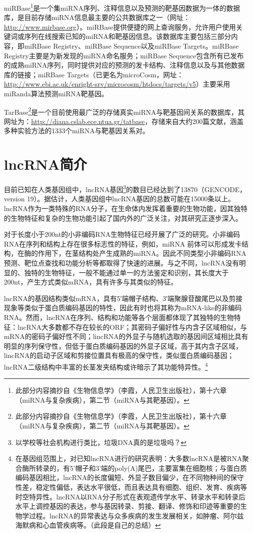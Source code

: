 \documentclass[11pt,a4paper,twoside]{book}
\begin{document}
miRBase\footnote{此部分内容摘抄自《生物信息学》（李霞，人民卫生出版社），第十六章（miRNA与复杂疾病），第二节（miRNA与其靶基因）。}是一个集miRNA序列、注释信息以及预测的靶基因数据为一体的数据库，是目前存储miRNA信息最主要的公共数据库之一（网址：\href{http://www.mirbase.org}{http://www.mirbase.org}）。miRBase提供便捷的网上查询服务，允许用户使用关键词或序列在线搜索已知的miRNA和靶基因信息。该数据库主要包括三部分内容，即miRBase Registry、miRBase Sequence以及miRBase Targets。miRBase Registry主要是为新发现的miRNA命名服务；miRBase Sequence包含所有已发布的成熟miRNA序列，同时提供对应的预测的发卡结构、注释信息以及与其他数据库的链接；miRBase Targets（已更名为microCosm，网址：\href{http://www.ebi.ac.uk/enright-srv/microcosm/htdocs/targets/v5}{http://www.ebi.ac.uk/enright-srv/microcosm/htdocs/targets/v5}）主要采用miRanda算法预测miRNA靶基因。

TarBase\footnote{此部分内容摘抄自《生物信息学》（李霞，人民卫生出版社），第十六章（miRNA与复杂疾病），第二节（miRNA与其靶基因）。}是一个目前使用最广泛的存储真实miRNA与靶基因间关系的数据库，其网址为：\href{http://diana.cslab.ece.ntua.gr/tatbase}{http://diana.cslab.ece.ntua.gr/tatbase}，存储来自大约200篇文献，涵盖多种实验方法的1333个miRNA与靶基因关系对。

\section{lncRNA简介}
目前已知在人类基因组中，lncRNA基因\footnote{以学校等社会机构进行类比，垃圾DNA真的是垃圾吗？}的数目已经达到了13870（GENCODE，version 19）。据估计，人类基因组中lncRNA基因的总数可能在15000条以上。lncRNA作为一类特殊的RNA分子，在生命体内发挥着重要的生物功能，因其独特的生物特征和复杂的生物功能引起了国内外的广泛关注，对其研究正逐步深入。

对于长度小于200nt的小非编码RNA生物特征已经开展了广泛的研究。小非编码RNA在序列和结构上存在很多标志性的特征，例如，miRNA
前体可以形成发卡结构，在酶的作用下，在茎结构处产生成熟的miRNA。因此不同类型小非编码RNA预测、靶位点查找和功能分析等都取得了快速的进展。与之不同，lncRNA没有明显的、独特的生物特征，一般不能通过单一的方法鉴定和识别，其长度大于200nt，产生方式类似mRNA，具有许多与其类似的特征。

lncRNA的基因结构类似mRNA，具有5′端帽子结构、3′端聚腺苷酸尾巴以及剪接现象等类似于蛋白质编码基因的特性，因此有时也将其称为mRNA-like的非编码RNA。然而，lncRNA在序列、结构和功能等各个层面都体现了其独特的生物特征：lncRNA大多数都不存在较长的ORF；其密码子偏好性与内含子区域相似，与mRNA的密码子偏好性不同；lincRNA的外显子与随机选取的基因间区域相比具有明显的序列保守性，但低于蛋白质编码基因的外显子区域，高于其内含子区域，lincRNA的启动子区域和剪接位置具有极高的保守性，类似蛋白质编码基因；lncRNA二级结构中丰富的长茎发夹结构或许暗示了其功能特异性。\footnote{在基因组范围上，对已知lncRNA进行的研究表明：大多数lncRNA是被RNA聚合酶所转录的，有5'帽子和3'端的poly(A)尾巴，主要富集在细胞核；与蛋白质编码基因相比，lncRNA的长度偏短、外显子数目偏少，在不同物种间的保守性差，稳定性偏低，表达水平很低，而且表达具有细胞、组织、发育、疾病等时空特异性。lncRNA以RNA分子形式在表观遗传学水平、转录水平和转录后水平上调控基因的表达，参与基因转录、剪接、翻译、修饰和印迹等重要的生物学过程。lncRNA的异常表达与众多疾病的发生发展相关，如肿瘤、阿尔兹海默病和心血管疾病等。（此段是自己的总结）}
\end{document}
